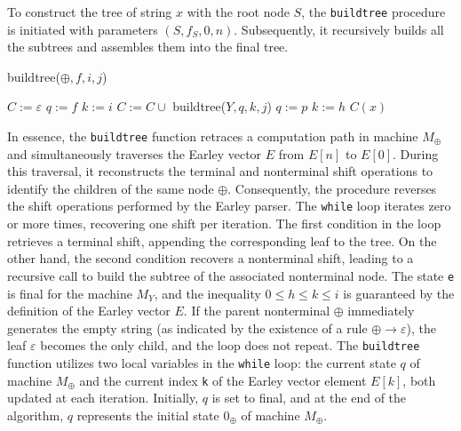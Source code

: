To construct the tree of string $x$ with the root node $S$, the \texttt{buildtree} procedure is initiated with parameters $(S, f_S, 0, n)$. 
Subsequently, it recursively builds all the subtrees and assembles them into the final tree.
\begin{algorithm}[H]
  \caption{buildtree($\oplus, f, i, j$)}
      \begin{algorithmic}[1]
          \State $C := \varepsilon$
          \State $q := f$
          \State $k := i$
              \EndIf 
                  \State $C := C \cup$ buildtree($Y, q, k, j$)
              \EndIf 
              \State $q := p$ 
              \State $k := h $
          \EndWhile
          \State \Return $C(x)$
      \end{algorithmic}
\end{algorithm}
In essence, the \texttt{buildtree} function retraces a computation path in machine $M_\oplus$ and simultaneously traverses the Earley vector $E$ from $E[n]$ to $E[0]$.
During this traversal, it reconstructs the terminal and nonterminal shift operations to identify the children of the same node $\oplus$. 
Consequently, the procedure reverses the shift operations performed by the Earley parser.
The \texttt{while} loop iterates zero or more times, recovering one shift per iteration. 
The first condition in the loop retrieves a terminal shift, appending the corresponding leaf to the tree.
On the other hand, the second condition recovers a nonterminal shift, leading to a recursive call to build the subtree of the associated nonterminal node. 
The state \texttt{e} is final for the machine $M_Y$, and the inequality $0 \leq h \leq k \leq i$ is guaranteed by the definition of the Earley vector $E$. If the parent nonterminal $\oplus$ immediately generates the empty string (as indicated by the existence of a rule $\oplus \rightarrow \varepsilon$), the leaf $\varepsilon$ becomes the only child, and the loop does not repeat.
The \texttt{buildtree} function utilizes two local variables in the \texttt{while} loop: the current state $q$ of machine $M_\oplus$ and the current index \texttt{k} of the Earley vector element $E[k]$, both updated at each iteration. Initially, $q$ is set to final, and at the end of the algorithm, $q$ represents the initial state $0_\oplus$ of machine $M_\oplus$. 

